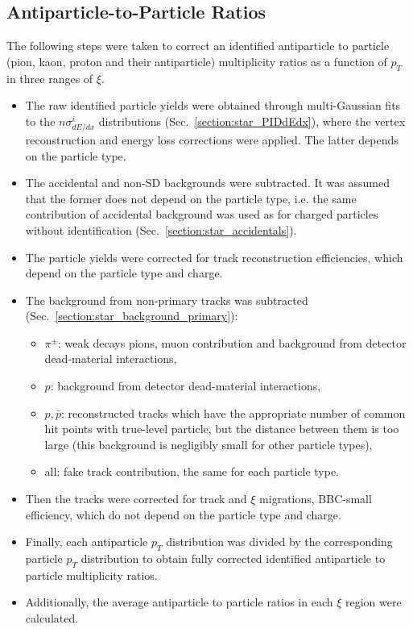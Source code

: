 \subsection{Antiparticle-to-Particle Ratios}\label{section:star_ratios}
The following steps were taken to correct an  identified antiparticle to particle (pion, kaon, proton and their antiparticle) multiplicity ratios as a function of $p_T$ in three ranges of $\xi$.
\begin{itemize}
	\item The raw identified particle yields were obtained through multi-Gaussian fits to the $n\sigma^i_{dE/dx}$ distributions (Sec.~\ref{section:star_PIDdEdx}), where the vertex reconstruction and energy loss corrections were applied. The latter depends on the particle type.
	\item The accidental and non-SD backgrounds were subtracted. It was assumed that the former does not depend on the particle type, i.e. the same contribution of accidental background was used as for charged particles without identification (Sec.~\ref{section:star_accidentals}).
	\item The particle yields were corrected for track reconstruction efficiencies, which depend on the particle type and charge.
	\item The background from non-primary tracks was subtracted (Sec.~\ref{section:star_background_primary}):
	\begin{itemize}
		\item $\pi^\pm$: weak decays pions, muon contribution and background from  detector dead-material interactions,
		\item $p$: background from  detector dead-material interactions,
		\item $p,\bar{p}$: reconstructed tracks which have the appropriate number of common hit points with true-level particle, but the distance between them is too large (this background is negligibly small for other particle types),
		\item all: fake track contribution, the same for each particle type. 
	\end{itemize}
	\item Then the tracks were corrected for track and $\xi$ migrations, BBC-small efficiency, which do not depend on the particle type and charge.
	\item Finally, each antiparticle $p_T$ distribution was divided by the corresponding particle $p_T$ distribution to obtain fully corrected identified antiparticle to particle multiplicity ratios.
	\item Additionally, the average antiparticle to particle ratios in each $\xi$ region were calculated.
\end{itemize}